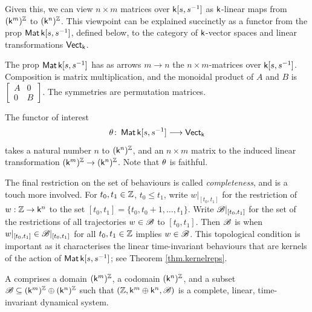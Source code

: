 Given this, we can view $n\times m$ matrices over ${\mathsf{k}[s,s^{-1}]}$ as $\mathsf{k}$-linear maps from
$(\mathsf{k}^m)^{\mathbb Z}$ to $(\mathsf{k}^n)^{\mathbb Z}$. This viewpoint can be explained succinctly as a functor from
the prop $\operatorname{\mathsf{Mat}}{\mathsf{k}[s,s^{-1}]}$, defined below, to the category of $\mathsf{k}$-vector spaces and
linear transformations $\operatorname{\mathsf{Vect}}_{\mathsf{k}}$.

\begin{definition}
  The prop $\operatorname{\mathsf{Mat}}{\mathsf{k}[s,s^{-1}]}$ has as arrows $m \to n$ the $n\times m$-matrices over
  ${\mathsf{k}[s,s^{-1}]}$. Composition is matrix multiplication, and the monoidal product of $A$
  and $B$ is $\left[\begin{smallmatrix} A & 0 \\ 0 & B
  \end{smallmatrix}\right]$. The symmetries are permutation matrices.
\end{definition}

The functor of interest
\[
  \theta{\colon} \operatorname{\mathsf{Mat}}{\mathsf{k}[s,s^{-1}]} \longrightarrow \operatorname{\mathsf{Vect}}_{\mathsf{k}}
\]
takes a natural number $n$ to $(\mathsf{k}^n)^{\mathbb Z}$, and an $n\times m$ matrix to the
induced linear transformation $(\mathsf{k}^m)^{\mathbb Z} \to (\mathsf{k}^n)^{\mathbb Z}$. Note that $\theta$ is
faithful.

\smallskip
The final restriction on the set of behaviours is called \emph{completeness},
and is a touch more involved. For $t_0,t_1 \in {\mathbb Z}$, $t_0 \le t_1$, write
$w|_{[t_0,t_1]}$ for the restriction of $w: {\mathbb Z} \to \mathsf{k}^n$ to the set $[t_0,t_1] =
\{t_0, t_0+1, \dots, t_1\}$. Write  ${\mathscr B}|_{[t_0,t_1]}$ for the set of the
restrictions of all trajectories $w \in {\mathscr B}$ to $[t_0,t_1]$.  Then ${\mathscr B}$ is
 when $w|_{[t_0,t_1]} \in {\mathscr B}|_{[t_0,t_1]}$ for all $t_0,t_1
\in {\mathbb Z}$ implies $w \in {\mathscr B}$. This topological condition is important as it
characterises the linear time-invariant behaviours that are kernels of the
action of $\operatorname{\mathsf{Mat}}{\mathsf{k}[s,s^{-1}]}$; see Theorem \ref{thm.kernelreps}.


\begin{definition}
  A  comprises a domain
  $(\mathsf{k}^m)^{\mathbb Z}$, a codomain $(\mathsf{k}^n)^{\mathbb Z}$, and a subset ${\mathscr B} \subseteq (\mathsf{k}^m)^{\mathbb Z}
  \oplus (\mathsf{k}^n)^{\mathbb Z}$ such that $({\mathbb Z},\mathsf{k}^m \oplus \mathsf{k}^n,{\mathscr B})$ is a complete, linear,
  time-invariant dynamical system.
\end{definition}

